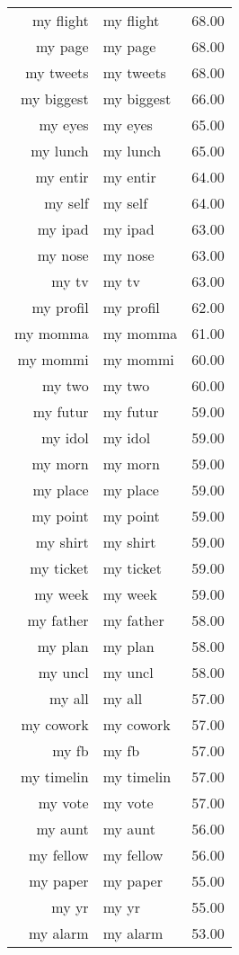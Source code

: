 \begin{table}[ht]
\begin{tabular}{rlr}
  my flight & my flight & 68.00 \\ 
  my page & my page & 68.00 \\ 
  my tweets & my tweets & 68.00 \\ 
  my biggest & my biggest & 66.00 \\ 
  my eyes & my eyes & 65.00 \\ 
  my lunch & my lunch & 65.00 \\ 
  my entir & my entir & 64.00 \\ 
  my self & my self & 64.00 \\ 
  my ipad & my ipad & 63.00 \\ 
  my nose & my nose & 63.00 \\ 
  my tv & my tv & 63.00 \\ 
  my profil & my profil & 62.00 \\ 
  my momma & my momma & 61.00 \\ 
  my mommi & my mommi & 60.00 \\ 
  my two & my two & 60.00 \\ 
  my futur & my futur & 59.00 \\ 
  my idol & my idol & 59.00 \\ 
  my morn & my morn & 59.00 \\ 
  my place & my place & 59.00 \\ 
  my point & my point & 59.00 \\ 
  my shirt & my shirt & 59.00 \\ 
  my ticket & my ticket & 59.00 \\ 
  my week & my week & 59.00 \\ 
  my father & my father & 58.00 \\ 
  my plan & my plan & 58.00 \\ 
  my uncl & my uncl & 58.00 \\ 
  my all & my all & 57.00 \\ 
  my cowork & my cowork & 57.00 \\ 
  my fb & my fb & 57.00 \\ 
  my timelin & my timelin & 57.00 \\ 
  my vote & my vote & 57.00 \\ 
  my aunt & my aunt & 56.00 \\ 
  my fellow & my fellow & 56.00 \\ 
  my paper & my paper & 55.00 \\ 
  my yr & my yr & 55.00 \\ 
  my alarm & my alarm & 53.00 \\ 

\end{tabular}
\end{table}
